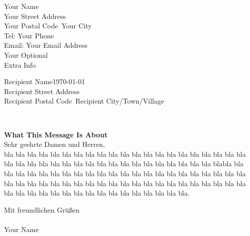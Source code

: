 \documentclass{article}
\newcommand{\recipientname}{Recipient Name}
\newcommand{\recipientstreet}{Recipient Street Address}
\newcommand{\recipientpostalcode}{Recipient Postal Code}
\newcommand{\recipientcity}{Recipient City/Town/Village}
\newcommand{\yourname}{Your Name}
\newcommand{\yourstreet}{Your Street Address}
\newcommand{\yourpostalcode}{Your Postal Code}
\newcommand{\yourcity}{Your City}
\newcommand{\yourphone}{Your Phone}
\newcommand{\youremail}{Your Email Address}
\newcommand{\yourextrainfo}{Your Optional\\Extra Info}
\begin{document}
{
{
\footnotesize
\hfill  \noindent
\begin{minipage}[t]{0.33\textwidth}
\yourname\\
\yourstreet\\
\yourpostalcode~\yourcity\\
Tel: \yourphone\\
Email:  \youremail\\
\yourextrainfo

\end{minipage}
\vspace{1cm}


}


\noindent \recipientname \hfill \today\\
\recipientstreet\\
\recipientpostalcode~\recipientcity
}\\
\vspace{1cm}


{
\noindent \textbf{What This Message Is About}
}\\

{
\noindent Sehr geehrte Damen und Herren,\\

\noindent bla bla bla bla bla bla bla bla bla bla bla bla bla bla bla bla bla bla bla bla bla bla bla bla bla bla bla bla bla bla bla bla bla bla bla bla bla bla bla blabla bla bla bla bla bla bla bla bla bla bla bla bla bla bla bla bla bla bla bla bla bla bla bla bla bla bla bla bla bla bla bla bla bla bla bla bla bla bla bla bla bla bla bla bla bla bla bla bla bla bla bla bla bla bla bla bla bla bla bla.
}
{

\vspace{3cm}
{
\noindent Mit freundlichen Grüßen\\
}
\vspace{1cm}\\ %
\noindent \yourname


}
\end{document}
